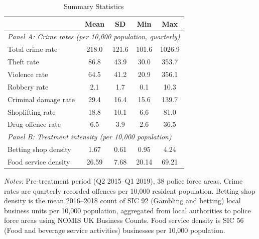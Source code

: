 \begin{table}[htbp]
\centering
\caption{Summary Statistics}
\label{tab:summary}
\begin{threeparttable}
\begin{tabular}{lcccc}
\toprule
 & Mean & SD & Min & Max \\
\midrule
\multicolumn{5}{l}{\textit{Panel A: Crime rates (per 10,000 population, quarterly)}} \\
Total crime rate & 218.0 & 121.6 & 101.6 & 1026.9 \\
Theft rate & 86.8 & 43.9 & 30.0 & 353.7 \\
Violence rate & 64.5 & 41.2 & 20.9 & 356.1 \\
Robbery rate & 2.1 & 1.7 & 0.1 & 10.3 \\
Criminal damage rate & 29.4 & 16.4 & 15.6 & 139.7 \\
Shoplifting rate & 18.8 & 10.1 & 6.6 & 81.0 \\
Drug offence rate & 6.5 & 3.9 & 2.6 & 36.5 \\
\midrule
\multicolumn{5}{l}{\textit{Panel B: Treatment intensity (per 10,000 population)}} \\
Betting shop density & 1.67 & 0.61 & 0.95 & 4.24 \\
Food service density & 26.59 & 7.68 & 20.14 & 69.21 \\
\bottomrule
\end{tabular}
\begin{tablenotes}[flushleft]\footnotesize
\item \textit{Notes:} Pre-treatment period (Q2 2015--Q1 2019), 38 police force areas. Crime rates are quarterly recorded offences per 10,000 resident population. Betting shop density is the mean 2016--2018 count of SIC 92 (Gambling and betting) local business units per 10,000 population, aggregated from local authorities to police force areas using NOMIS UK Business Counts. Food service density is SIC 56 (Food and beverage service activities) businesses per 10,000 population.
\end{tablenotes}
\end{threeparttable}
\end{table}
